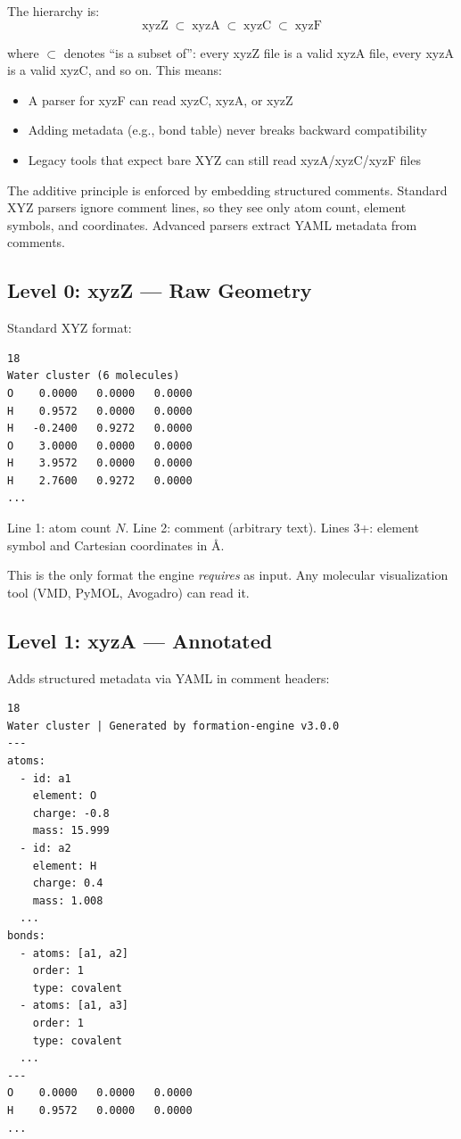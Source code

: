 \documentclass[11pt]{article}
\begin{document}
The hierarchy is:
\begin{equation}
\text{xyzZ} \;\subset\; \text{xyzA} \;\subset\; \text{xyzC} \;\subset\; \text{xyzF}
\end{equation}

where $\subset$ denotes ``is a subset of'': every xyzZ file is a valid xyzA file, every xyzA is a valid xyzC, and so on. This means:

\begin{itemize}
\item A parser for xyzF can read xyzC, xyzA, or xyzZ
\item Adding metadata (e.g., bond table) never breaks backward compatibility
\item Legacy tools that expect bare XYZ can still read xyzA/xyzC/xyzF files
\end{itemize}

The additive principle is enforced by embedding structured comments. Standard XYZ parsers ignore comment lines, so they see only atom count, element symbols, and coordinates. Advanced parsers extract YAML metadata from comments.

\subsection{Level 0: xyzZ — Raw Geometry}

Standard XYZ format:
\begin{lstlisting}
18
Water cluster (6 molecules)
O    0.0000   0.0000   0.0000
H    0.9572   0.0000   0.0000
H   -0.2400   0.9272   0.0000
O    3.0000   0.0000   0.0000
H    3.9572   0.0000   0.0000
H    2.7600   0.9272   0.0000
...
\end{lstlisting}

Line 1: atom count $N$. Line 2: comment (arbitrary text). Lines 3+: element symbol and Cartesian coordinates in \AA.

This is the only format the engine \textit{requires} as input. Any molecular visualization tool (VMD, PyMOL, Avogadro) can read it.

\subsection{Level 1: xyzA — Annotated}

Adds structured metadata via YAML in comment headers:
\begin{lstlisting}
18
Water cluster | Generated by formation-engine v3.0.0
---
atoms:
  - id: a1
    element: O
    charge: -0.8
    mass: 15.999
  - id: a2
    element: H
    charge: 0.4
    mass: 1.008
  ...
bonds:
  - atoms: [a1, a2]
    order: 1
    type: covalent
  - atoms: [a1, a3]
    order: 1
    type: covalent
  ...
---
O    0.0000   0.0000   0.0000
H    0.9572   0.0000   0.0000
...
\end{lstlisting}
\end{document}
